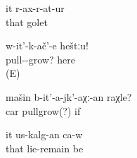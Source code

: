 \begin{exe}
	\ex	\label{ex:He left her (at home)}
	\gll	it	r-ax-r-at-ur\\
		that	golet\\
	\glt	{}

	\ex	\label{ex:Move here}
	\gll	w-it'-k-ač'-e	heštːu!\\
		pull--grow?	here\\
	\glt	{} (E)

	\ex	\label{ex:(What) if the car does not move}
	\gll	mašin	b-it'-a-jk'-aχː-an	raχle?\\
		car	pullgrow(?)	if\\
	\glt	{}

	\ex	\label{ex:He will / should go to sleep}
	\gll	it	us-kalg-an	ca-w\\
		that	lie-remain	be\\
	\glt	{}
\end{exe}



